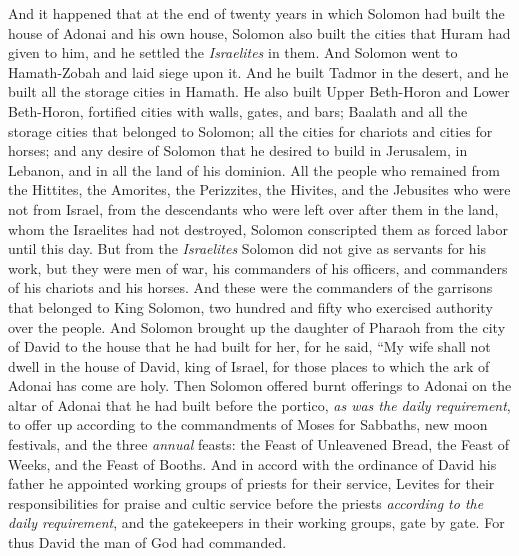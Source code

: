 \begin{biblechapter} %
 And it happened that at the end of twenty years in which Solomon had built the house of Adonai and his own house,
\verse Solomon also built the cities that Huram had given to him, and he settled the \textit{Israelites} in them.
\verse And Solomon went to Hamath-Zobah and laid siege upon it.
\verse And he built Tadmor in the desert, and he built all the storage cities in Hamath.
\verse He also built Upper Beth-Horon and Lower Beth-Horon, fortified cities with walls, gates, and bars;
\verse Baalath and all the storage cities that belonged to Solomon; all the cities for chariots and cities for horses; and any desire of Solomon that he desired to build in Jerusalem, in Lebanon, and in all the land of his dominion.
\verse All the people who remained from the Hittites, the Amorites, the Perizzites, the Hivites, and the Jebusites who were not from Israel,
\verse from the descendants who were left over after them in the land, whom the Israelites had not destroyed, Solomon conscripted them as forced labor until this day.
\verse But from the \textit{Israelites} Solomon did not give as servants for his work, but they were men of war, his commanders of his officers, and commanders of his chariots and his horses.
\verse And these were the commanders of the garrisons that belonged to King Solomon, two hundred and fifty who exercised authority over the people.
\verse And Solomon brought up the daughter of Pharaoh from the city of David to the house that he had built for her, for he said, “My wife shall not dwell in the house of David, king of Israel, for those places to which the ark of Adonai has come are holy.
\verse Then Solomon offered burnt offerings to Adonai on the altar of Adonai that he had built before the portico,
\verse \textit{as was the daily requirement}, to offer up according to the commandments of Moses for Sabbaths, new moon festivals, and the three \textit{annual} feasts: the Feast of Unleavened Bread, the Feast of Weeks, and the Feast of Booths.
\verse And in accord with the ordinance of David his father he appointed working groups of priests for their service, Levites for their responsibilities for praise and cultic service before the priests \textit{according to the daily requirement}, and the gatekeepers in their working groups, gate by gate. For thus David the man of God had commanded.

\end{biblechapter}
